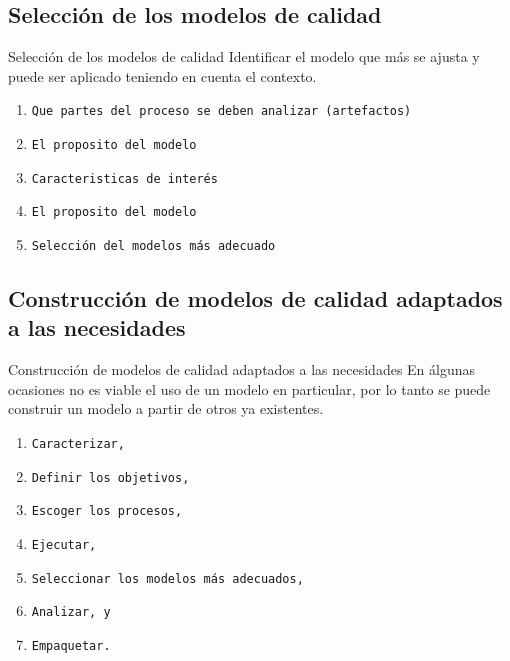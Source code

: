 \documentclass[10pt]{beamer}
\begin{document}
\subsection{Selecci\'on de los modelos de calidad}
\begin{frame}{Selecci\'on de los modelos de calidad}
 Identificar el modelo que m\'as se ajusta y puede ser aplicado teniendo en cuenta el contexto. 
 \begin{enumerate}
  \item {\tt Que partes del proceso se deben analizar (artefactos)} 
  \item {\tt El proposito del modelo}
  \item {\tt Caracteristicas de inter\'es} 
  \item {\tt El proposito del modelo}  
  \item {\tt Selecci\'on del modelos m\'as adecuado}   
 \end{enumerate}
\end{frame}
\subsection{Construcci\'on de modelos de calidad adaptados a las necesidades}
\begin{frame}{Construcci\'on de modelos de calidad adaptados a las necesidades}
 En \'algunas ocasiones no es viable el uso de un modelo en particular, por lo tanto se puede construir un modelo a partir de otros ya existentes.
 \begin{enumerate}
  \item {\tt Caracterizar,} 
  \item {\tt Definir los objetivos,}
  \item {\tt Escoger los procesos,} 
  \item {\tt Ejecutar,}  
  \item {\tt Seleccionar los modelos m\'as adecuados,}  
  \item {\tt Analizar, y}  
  \item {\tt Empaquetar.}  
 \end{enumerate}
\end{frame}
\end{document}
